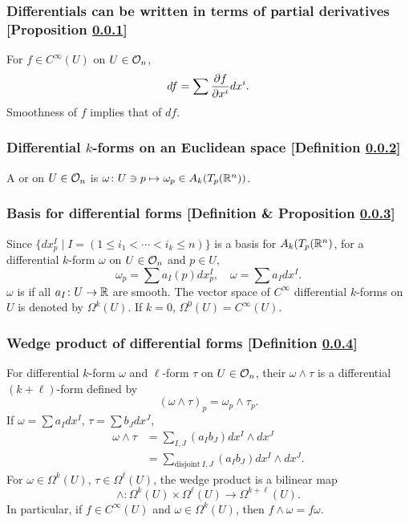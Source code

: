 \subsubsection{Differentials can be written in terms of partial derivatives [Proposition \ref{differentials-can-be-written-in-terms-of-partial-derivatives}]}\label{differentials-can-be-written-in-terms-of-partial-derivatives}
For $f \in C^\infty(U)$ on $U \in \mathcal{O}_{n}$,
\[
df = \sum \pfr{f}{x^i} dx^i.
\]
Smoothness of $f$ implies that of $df$.

\subsubsection{Differential $k$-forms on an Euclidean space [Definition \ref{differential-k-forms-on-an-euclidean-space}]}\label{differential-k-forms-on-an-euclidean-space}
A  or  on $U \in \mathcal{O}_{n}$ is $\omega \colon U \ni p \mapsto \omega_p \in A_k (T_p(\mathbb{R}^n))$.

\subsubsection{Basis for differential forms [Definition \& Proposition \ref{basis-for-differential-forms}]}\label{basis-for-differential-forms}
Since $\{ dx^I_p \mid I = (1 \le i_1 < \dotsb < i_k \le n) \}$ is a basis for $A_k (T_p(\mathbb{R}^n)$, for a differential $k$-form $\omega$ on $U \in \mathcal{O}_{n}$ and $p \in U$,
\[
\omega_p = \sum a_I (p) dx^I_p,\quad \omega = \sum a_I dx^I.
\]
$\omega$ is  if all $a_I \colon U \to \mathbb{R}$ are smooth. The vector space of $C^\infty$  differential $k$-forms on $U$ is denoted by $\Omega^k(U)$. If $k = 0$, $\Omega^0(U) = C^\infty(U)$.

\subsubsection{Wedge product of differential forms [Definition \ref{wedge-product-of-differential-forms}]}\label{wedge-product-of-differential-forms}
For differential $k$-form $\omega$ and $\ell$-form $\tau$ on $U \in \mathcal{O}_{n}$, their  $\omega \wedge \tau$ is a differential $(k+\ell)$-form defined by
\[
(\omega \wedge \tau)_p = \omega_p \wedge \tau_p.
\]
If $\omega = \sum a_I dx^I$, $\tau = \sum b_J dx^J$,
\begin{align*}
\omega \wedge \tau &= \sum_{I,J} (a_I b_J) dx^I \wedge dx^J \\
&= \sum_{\text{disjoint}\ I, J} (a_I b_J) dx^I \wedge dx^J.
\end{align*}
For $\omega \in \Omega^k (U)$, $\tau \in \Omega^\ell (U)$, the wedge product is a bilinear map
\[
\wedge \colon \Omega^k(U) \times \Omega^\ell(U) \to \Omega^{k+\ell}(U).
\]
In particular, if $f \in C^\infty (U)$ and $\omega \in \Omega^k(U)$, then $f \wedge \omega = f \omega$.

